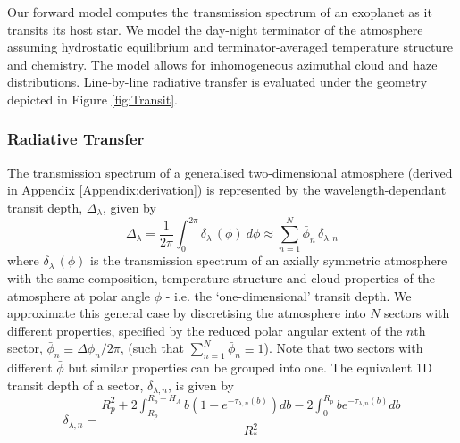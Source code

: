 \documentclass[fleqn,usenatbib]{mnras}
\begin{document}
Our forward model computes the transmission spectrum of an exoplanet as it transits its host star. We model the day-night terminator of the atmosphere assuming hydrostatic equilibrium and terminator-averaged temperature structure and chemistry. The model allows for inhomogeneous azimuthal cloud and haze distributions. Line-by-line radiative transfer is evaluated under the geometry depicted in Figure \ref{fig:Transit}.

\subsubsection{Radiative Transfer}\label{subsubsec:radiative_transfer}

The transmission spectrum of a generalised two-dimensional atmosphere (derived in Appendix \ref{Appendix:derivation}) is represented by the wavelength-dependant transit depth, $\Delta_{\lambda}$, given by
%
\begin{equation}
\Delta_{\lambda} = \frac{1}{2 \pi} \int_{0}^{2 \pi} \delta_{\lambda}\, (\phi) ~ d \phi \approx  \sum_{n=1}^{N} \bar{\phi}_{n} \, \delta_{\lambda, n}
	\label{eq:transit_depth_two_dim}
\end{equation}
%
where $\delta_{\lambda} \, (\phi)$ is the transmission spectrum of an axially symmetric atmosphere with the same composition, temperature structure and cloud properties of the atmosphere at polar angle $\phi$ - i.e. the `one-dimensional' transit depth. We approximate this general case by discretising the atmosphere into $N$ sectors with different properties, specified by the reduced polar angular extent of the $n$th sector, $\bar{\phi}_{n} \equiv \Delta \phi_{n}/2\pi$, (such that $\sum_{n=1}^{N} \bar{\phi}_{n} \equiv 1$). Note that two sectors with different $\bar{\phi}$ but similar properties can be grouped into one. The equivalent 1D transit depth of a sector, $\delta_{\lambda, n}$, is given by
%
\begin{equation}
\delta_{\lambda, n} = \frac{R_{p}^2 + 2 \displaystyle\int_{R_p}^{R_p+ H_A} b \left(1 - e^{-\tau_{\lambda, n}(b)} \right) db - 2 \displaystyle\int_{0}^{R_p} b e^{-\tau_{\lambda, n}(b)} db}{R_{*}^2}
	\label{eq:transit_depth_one_dim}
\end{equation}
%
\end{document}
